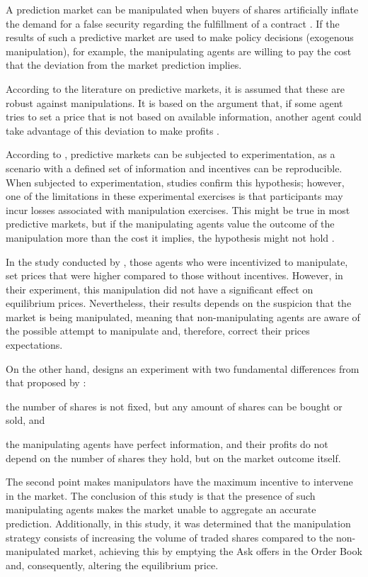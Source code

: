 A prediction market can be manipulated when buyers of shares artificially inflate the demand for a false security regarding the fulfillment of a contract \parencite{choo2022manipulation}. If the results of such a predictive market are used to make policy decisions (exogenous manipulation), for example, the manipulating agents are willing to pay the cost that the deviation from the market prediction implies.
    
According to the literature on predictive markets, it is assumed that these are robust against manipulations. It is based on the argument that, if some agent tries to set a price that is not based on available information, another agent could take advantage of this deviation to make profits \parencite{buckley2017effect}.
    
According to \cite{HANSON2006449}, predictive markets can be subjected to experimentation, as a scenario with a defined set of information and incentives can be reproducible. When subjected to experimentation, studies confirm this hypothesis; however, one of the limitations in these experimental exercises is that participants may incur losses associated with manipulation exercises. This might be true in most predictive markets, but if the manipulating agents value the outcome of the manipulation more than the cost it implies, the hypothesis might not hold \parencite{deck2013affecting}.

In the study conducted by \citeauthor{HANSON2006449}, those agents who were incentivized to manipulate, set prices that were higher compared to those without incentives. However, in their experiment, this manipulation did not have a significant effect on equilibrium prices. Nevertheless, their results depends on the suspicion that the market is being manipulated, meaning that non-manipulating agents are aware of the possible attempt to manipulate and, therefore, correct their prices expectations.
    
On the other hand, \citeauthor{deck2013affecting} designs an experiment with two fundamental differences from that proposed by : \begin{enumerate*}[label=(\roman*)]
    \item the number of shares is not fixed, but any amount of shares can be bought or sold, and
    \item the manipulating agents have perfect information, and their profits do not depend on the number of shares they hold, but on the market outcome itself.
\end{enumerate*} 
The second point makes manipulators have the maximum incentive to intervene in the market. The conclusion of this study is that the presence of such manipulating agents makes the market unable to aggregate an accurate prediction. Additionally, in this study, it was determined that the manipulation strategy consists of increasing the volume of traded shares compared to the non-manipulated market, achieving this by emptying the Ask offers in the Order Book and, consequently, altering the equilibrium price.